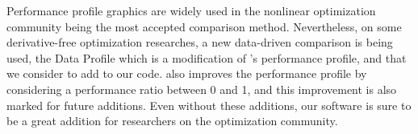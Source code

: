 Performance profile graphics are widely used in the nonlinear optimization
community being the most accepted comparison method.
Nevertheless, on some derivative-free optimization researches,  a new data-driven comparison is being used,
the Data Profile \cite{bib:more2009benchmarking} which is a modification of 
\citeauthor{Dolan:2002du}'s performance profile, and that we consider to add to our code. 
\textcite{bib:mahajan2012solving} also improves the performance profile by considering
a performance ratio between 0 and 1, and this improvement is also marked for
future additions. Even without these additions, our software is sure to be a great addition for
researchers on the optimization community.
